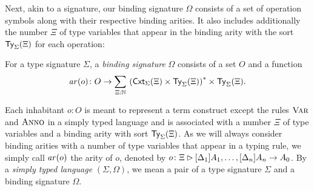 Next, akin to a signature, our binding signature $\Omega$ consists of a set of operation symbols along with their respective binding arities.
It also includes additionally the number $\Xi$ of type variables that appear in the binding arity with the sort $\mathsf{Ty}_{\Sigma}(\Xi)$ for each operation:
\begin{definition}\label{def:binding-signature}
  For a type signature $\Sigma$, a \emph{binding signature} $\Omega$ consists of a set $O$ and a function
  \[
    \arity(o) \colon O \to \sm{\Xi : \N} \left(\Cxt_\Sigma(\Xi) \times \Type_\Sigma(\Xi)\right)^* \times \Type_\Sigma(\Xi).
  \]
\end{definition}
Each inhabitant $o: O$ is meant to represent a term construct except the rules $\textnormal{\textsc{Var}}$ and $\textnormal{\textsc{Anno}}$ in a simply typed language and is associated with a number $\Xi$ of type variables and a binding arity with sort $\mathsf{Ty}_{\Sigma}(\Xi)$.
As we will always consider binding arities with a number of type variables that appear in a typing rule, we simply call $\mathit{ar}(o)$ the arity of $o$, denoted by $o\colon\Xi \rhd [\Delta_1]A_1, \ldots, [\Delta_{n}]A_{n} \to A_0$.
By a \emph{simply typed language} $(\Sigma, \Omega)$, we mean a pair of a type signature $\Sigma$ and a binding signature $\Omega$.

